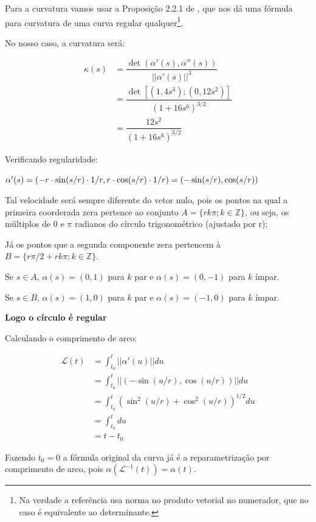 \documentclass[12pt,letterpaper]{article}
\newcommand\lcur{\mathcal{L}}
\newcommand{\blue}[1]{{\color{blue}{#1}}}
\begin{document}
\begin{enumerate}
\begin{itemize}
		Para a curvatura vamos usar a Proposição 2.2.1 de \cite{pressley2001elementary}, que nos dá uma fórmula para curvatura de uma curva regular qualquer\footnote{Na verdade a referência usa norma no produto vetorial no numerador, que no caso é equivalente ao determinante.}.
		
		
		No nosso caso, a curvatura será:
		 
		 \begin{align*}
		 	\kappa(s)&=\dfrac{\det(\alpha'(s),\alpha''(s))}{||\alpha'(s)||^3}\\
		 	&=\dfrac{\det[(1,4s^3);(0,12s^2)]}{(1+16s^6)^{3/2}}\\
		 	&=\dfrac{12s^2}{(1+16s^6)^{3/2}}
		 \end{align*}
	 		
	 
		\blue{
			\item (círculos) $\alpha(s)=(a+r\cdot\cos(s/r),b+r\cdot\sin(s/r)), s\in\mathbb{R},r>0;$}
		
		Verificando regularidade:
		
		$\alpha'(s)=(-r\cdot\sin(s/r)\cdot1/r,r\cdot\cos(s/r)\cdot1/r)\\=(-\sin(s/r),\cos(s/r))$
		
		Tal velocidade será sempre diferente do vetor nulo, pois os pontos na qual a primeira coorderada zera pertence ao conjunto $A=\{rk\pi;k\in\mathbb{Z}\}$, ou seja, os múltiplos de $0$ e $\pi$ radianos do círculo trigonométrico (ajustado por r);
		
		Já os pontos que a segunda componente zera pertencem à $B=\{r\pi/2+rk\pi;k\in\mathbb{Z}\}$.
		
		Se $s\in A$, $\alpha(s)=(0,1)$ para $k$ par e $\alpha(s)=(0,-1)$ para $k$ ímpar.
		
		Se $s\in B$, $\alpha(s)=(1,0)$ para $k$ par e $\alpha(s)=(-1,0)$ para $k$ ímpar.
		
		\textbf{Logo o círculo é regular}
		
		Calculando o comprimento de arco:
		
		\begin{align*}
			\lcur(t)&=\int_{t_0}^{t}||\alpha'(u)||du\\
			&=\int_{t_0}^{t}||(-\sin(u/r),\cos(u/r))||du\\
			&=\int_{t_0}^t(\sin^2(u/r)+\cos^2(u/r))^{1/2}du\\
			&=\int_{t_0}^tdu\\
			&=t-t_0
		\end{align*}
	
	Fazendo $t_0=0$ a fórmula original da curva já é a reparametrização por comprimento de arco, pois $\alpha(\lcur^{-1}(t))=\alpha(t)$.
	

\end{itemize}
\end{enumerate}
\end{document}
